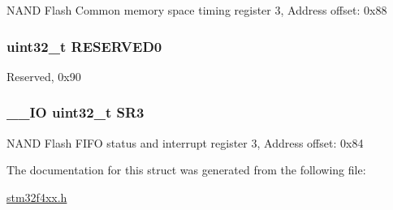 N\-A\-N\-D Flash Common memory space timing register 3, Address offset\-: 0x88 \hypertarget{struct_f_s_m_c___bank3___type_def_af86c61a5d38a4fc9cef942a12744486b}{
\subsubsection[{R\-E\-S\-E\-R\-V\-E\-D0}]{\setlength{\rightskip}{0pt plus 5cm}uint32\-\_\-t R\-E\-S\-E\-R\-V\-E\-D0}}\label{struct_f_s_m_c___bank3___type_def_af86c61a5d38a4fc9cef942a12744486b}
Reserved, 0x90 \hypertarget{struct_f_s_m_c___bank3___type_def_af30c34f7c606cb9416a413ec5fa36491}{
\subsubsection[{S\-R3}]{\setlength{\rightskip}{0pt plus 5cm}\-\_\-\-\_\-\-I\-O uint32\-\_\-t S\-R3}}\label{struct_f_s_m_c___bank3___type_def_af30c34f7c606cb9416a413ec5fa36491}
N\-A\-N\-D Flash F\-I\-F\-O status and interrupt register 3, Address offset\-: 0x84 

The documentation for this struct was generated from the following file\-:\begin{DoxyCompactItemize}
\item 
\hyperlink{stm32f4xx_8h}{stm32f4xx.\-h}\end{DoxyCompactItemize}
